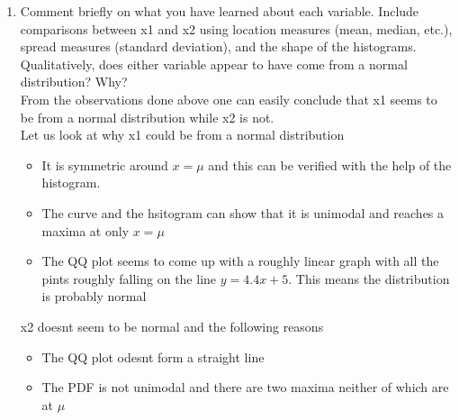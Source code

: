 \documentclass[fontsize=10pt]{scrartcl}
\begin{document}
\begin{enumerate}
		\item
		Comment briefly on what you have learned about each variable. Include comparisons between x1 and x2 using location measures (mean, median, etc.), spread measures (standard deviation), and the shape of the histograms. Qualitatively, does either variable appear to have come from a normal distribution? Why? \\

		From the observations done above one can easily conclude that x1 seems to be from a normal distribution while x2 is not. \\

		Let us look at why x1 could be from a normal distribution \\
		\begin{itemize}
			\item
			It is symmetric around $x=\mu$ and this can be verified with the help of the histogram.

			\item
			The curve and the hsitogram can show that it is unimodal and reaches a maxima at only $x=\mu$

			\item
			The QQ plot seems to come up with a roughly linear graph with all the pints roughly falling on the line $y=4.4x +5$. This means the distribution is probably normal
		\end{itemize}

		x2 doesnt seem to be normal and the following reasons 
		\begin{itemize}
			\item
			The QQ plot odesnt form a straight line

			\item
			The PDF is not unimodal and there are two maxima neither of which are at $\mu$
		\end{itemize}
	\end{enumerate}
\end{document}
